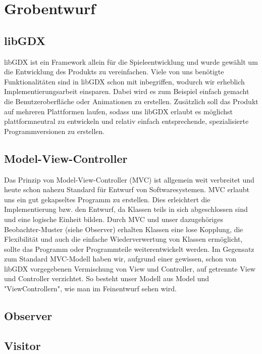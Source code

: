 \section{Grobentwurf}

\subsection{libGDX}
libGDX ist ein Framework allein für die Spieleentwicklung und wurde gewählt um die Entwicklung des Produkts zu vereinfachen.
Viele von uns benötigte Funktionalitäten sind in libGDX schon mit inbegriffen, wodurch wir erheblich Implementierungsarbeit einsparen.
Dabei wird es zum Beispiel einfach gemacht die Benutzeroberfläche oder Animationen zu erstellen.
Zusätzlich soll das Produkt auf mehreren Plattformen laufen, sodass uns libGDX erlaubt es möglichst plattformneutral zu entwickeln 
und relativ einfach entsprechende, spezialisierte Programmversionen zu erstellen.

\subsection{Model-View-Controller}
Das Prinzip von Model-View-Controller (MVC) ist allgemein weit verbreitet und heute schon nahezu Standard für Entwurf von Softwaresystemen. 
MVC erlaubt uns ein gut gekapseltes Programm zu erstellen. Dies erleichtert die Implementierung bzw. den Entwurf, da Klassen teils in sich abgeschlossen sind
und eine logische Einheit bilden. Durch MVC und unser dazugehöriges Beobachter-Muster (siehe Observer) erhalten Klassen eine lose Kopplung,
die Flexibilität und auch die einfache Wiederverwertung von Klassen ermöglicht, sollte das Programm oder Programmteile weiterentwickelt werden.
Im Gegensatz zum Standard MVC-Modell haben wir, aufgrund einer gewissen, schon von libGDX vorgegebenen Vermischung von View und Controller,
auf getrennte View und Controller verzichtet. So besteht unser Modell aus Model und "ViewControllern", wie man im Feinentwurf sehen wird.

\subsection{Observer}

\subsection{Visitor}

